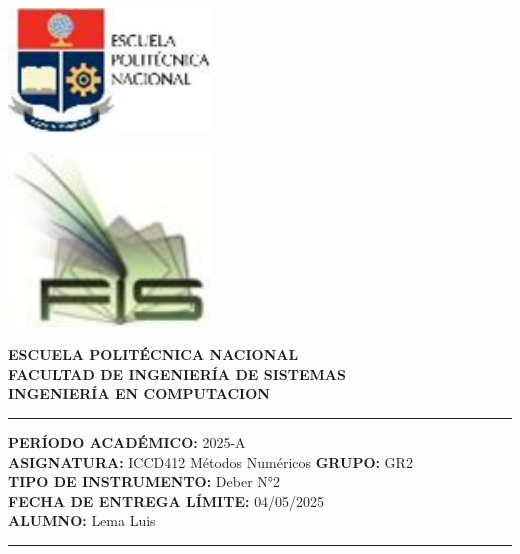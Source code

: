 \documentclass[12pt]{article}
\begin{document}
\begin{minipage}{0.45\textwidth}
    \includegraphics[width=0.4\textwidth]{inFiles/Figures/epnLogo.jpg}
\end{minipage}
\hfill
\begin{minipage}{0.45\textwidth}
    \raggedleft
    \includegraphics[width=0.4\textwidth]{inFiles/Figures/FIS_logo.jpg}
\end{minipage}

\vspace{0.5cm}

\begin{center}
    \textbf{ESCUELA POLITÉCNICA NACIONAL}\\[0.2cm]
    \textbf{FACULTAD DE INGENIERÍA DE SISTEMAS}\\[0.2cm]
    \textbf{INGENIERÍA {\textbf{EN COMPUTACION}}}
\end{center}

\vspace{0.5cm}
\hrule
\vspace{0.5cm}

\noindent\textbf{PERÍODO ACADÉMICO:} 2025-A\\[0.2cm]
\noindent\textbf{ASIGNATURA:} ICCD412 Métodos Numéricos \hfill \textbf{GRUPO:} GR2\\[0.2cm]
\noindent\textbf{TIPO DE INSTRUMENTO:} {Deber N°2}\\[0.2cm]
\noindent\textbf{FECHA DE ENTREGA LÍMITE:} {04/05/2025}\\[0.2cm]
\noindent\textbf{ALUMNO:} {Lema Luis}

\vspace{0.5cm}
\hrule
\vspace{1cm}
\end{document}
